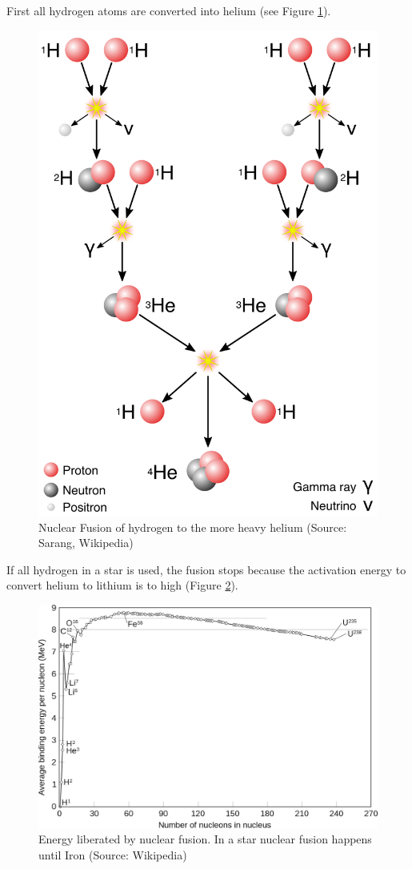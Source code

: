 \documentclass[
  11pt,
]{book}
\begin{document}
First all hydrogen atoms are converted into helium (see Figure \ref{fig:nuclearFusion}).

\begin{figure}

{\centering \includegraphics[width=0.5\linewidth]{./figs/fusion} 

}

\caption{Nuclear Fusion of hydrogen to the more heavy helium (Source: Sarang, Wikipedia)}\label{fig:nuclearFusion}
\end{figure}

If all hydrogen in a star is used, the fusion stops because the activation energy to convert helium to lithium is to high (Figure \ref{fig:fusionEnergy}).

\begin{figure}

{\centering \includegraphics[width=0.5\linewidth]{./figs/fusionEnergy} 

}

\caption{Energy liberated by nuclear fusion. In a star nuclear fusion happens until Iron (Source: Wikipedia)}\label{fig:fusionEnergy}
\end{figure}
\end{document}

